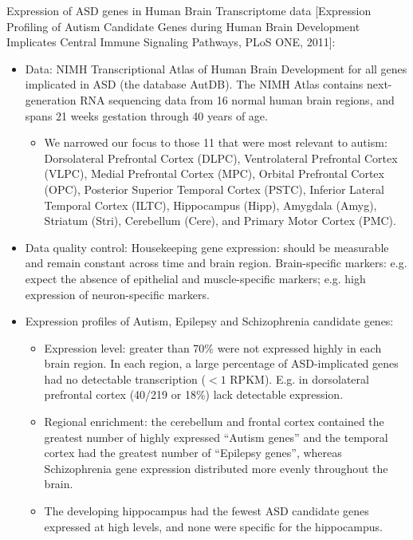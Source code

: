 \documentclass{report}
\begin{document}
Expression of ASD genes in Human Brain Transcriptome data [Expression Profiling of Autism Candidate Genes during Human Brain Development Implicates Central Immune Signaling Pathways, PLoS ONE, 2011]: 
\begin{itemize}
	\item Data: NIMH Transcriptional Atlas of Human Brain Development for all genes implicated in ASD (the database AutDB). The NIMH Atlas contains next-generation RNA sequencing data from 16 normal human brain regions, and spans 21 weeks gestation through 40 years of age. 
	\begin{itemize}
		\item We narrowed our focus to those 11 that were most relevant to autism: Dorsolateral Prefrontal Cortex (DLPC), Ventrolateral Prefrontal Cortex (VLPC), Medial Prefrontal Cortex (MPC), Orbital Prefrontal Cortex (OPC), Posterior Superior Temporal Cortex (PSTC), Inferior Lateral Temporal Cortex (ILTC), Hippocampus (Hipp), Amygdala (Amyg), Striatum (Stri), Cerebellum (Cere), and Primary Motor Cortex (PMC).
	\end{itemize}
	
	\item Data quality control: Housekeeping gene expression: should be measurable and remain constant across time and brain region. Brain-specific markers: e.g. expect the absence of epithelial and muscle-specific markers; e.g. high expression of neuron-specific markers.
	
	\item Expression profiles of Autism, Epilepsy and Schizophrenia candidate genes:
	\begin{itemize}
		\item Expression level: greater than 70\% were not expressed highly in each brain region. In each region, a large percentage of ASD-implicated genes had no detectable transcription ($<1$ RPKM). E.g. in dorsolateral prefrontal cortex (40/219 or 18\%) lack detectable expression. 
		
		\item Regional enrichment: the cerebellum and frontal cortex contained the greatest number of highly expressed ``Autism genes'' and the temporal cortex had the greatest number of ``Epilepsy genes'', whereas Schizophrenia gene expression distributed more evenly throughout the brain. 
		
		\item The developing hippocampus had the fewest ASD candidate genes expressed at high levels, and none were specific for the hippocampus. 
		

\end{itemize}
\end{itemize}
\end{document}
